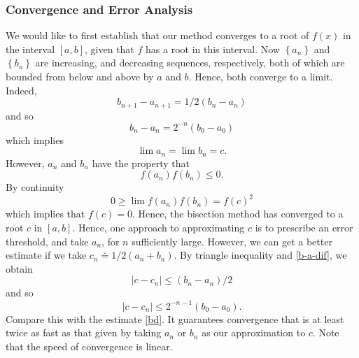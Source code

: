 \documentclass[12pt]{article}
\theoremstyle{plain}
\theoremstyle{definition}
\theoremstyle{remark}
\numberwithin{equation}{section}  %
\begin{document}
\subsubsection*{Convergence and Error Analysis} 
We would like to first establish that our method converges to a root of
$f(x)$ in the interval $[a,b]$, given that $f$ has a root in this interval.
Now $ \left\{ a_n \right\} $ and $ \left\{ b_n \right\}  $ 
are increasing, and decreasing sequences, respectively, both of which
are bounded from below and above by $a$ and $b$. Hence, both converge
to a limit. Indeed,
\begin{equation}
	\label{b-a-dif}
	b_{n+1} - a_{n+1} = 1/2(b_n - a_n)
\end{equation}
and so
\begin{equation}
	\label{bd}
	b_{n} - a_{n} = 2^{-n}(b_0 - a_0)
\end{equation}
which implies
\begin{equation*}
	\lim a_n = \lim b_{n} = c.
\end{equation*}
However, $a_n$ and $b_n$ have the property that
\begin{equation*}
	f(a_n)f(b_n) \le 0.
\end{equation*}
By continuity
\begin{equation*}
	0 \ge \lim f(a_n)f(b_n) = f(c)^2
\end{equation*}
which implies that $f(c) = 0$. Hence, the bisection method has converged to a root
$c$ in $[a,b]$.
Hence, one approach to approximating $c$ is to prescribe an error threshold, and
take $a_n$, for $n$ sufficiently large. However, we can get a better estimate
if we take $c_n \doteq 1/2(a_n + b_n)$. By triangle inequality and \eqref{b-a-dif}, we obtain
\begin{equation*}
	|c - c_n| \le (b_n - a_n)/2
\end{equation*}
and so
\begin{equation*}
	|c - c_n| \le 2^{-n - 1}(b_0 - a_0).
\end{equation*}
Compare this with the estimate \eqref{bd}. It guarantees convergence
that is at least twice as fast as that given by taking $a_n$ or $b_n$
as our approximation to $c$. Note that the speed of convergence is linear.
\end{document}
